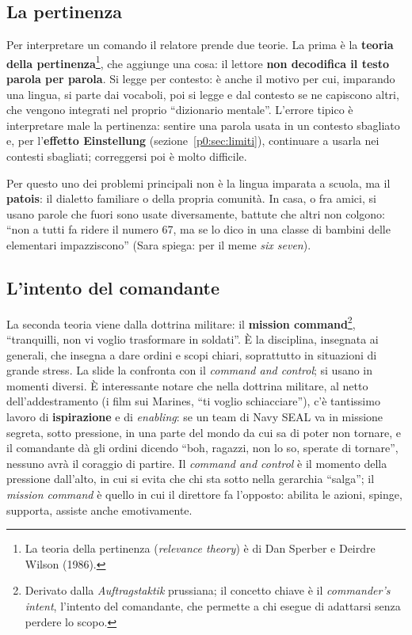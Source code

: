 \subsection{La pertinenza}

Per interpretare un comando il relatore prende due teorie. La prima è la
\textbf{teoria della pertinenza}\footnote{La teoria della pertinenza
(\emph{relevance theory}) è di Dan Sperber e Deirdre Wilson (1986).}, che
aggiunge una cosa: il lettore \textbf{non decodifica il testo parola per
parola}. Si legge per contesto: è anche il motivo per cui, imparando una
lingua, si parte dai vocaboli, poi si legge e dal contesto se ne capiscono
altri, che vengono integrati nel proprio ``dizionario mentale''. L'errore tipico
è interpretare male la pertinenza: sentire una parola usata in un contesto
sbagliato e, per l'\textbf{effetto Einstellung} (sezione~\ref{p0:sec:limiti}),
continuare a usarla nei contesti sbagliati; correggersi poi è molto difficile.

Per questo uno dei problemi principali non è la lingua imparata a scuola, ma il
\textbf{patois}: il dialetto familiare o della propria comunità. In casa, o fra
amici, si usano parole che fuori sono usate diversamente, battute che altri non
colgono: ``non a tutti fa ridere il numero 67, ma se lo dico in una classe di
bambini delle elementari impazziscono'' (Sara spiega: per il meme \emph{six
seven}).

\subsection{L'intento del comandante}

La seconda teoria viene dalla dottrina militare: il \textbf{mission
command}\footnote{Derivato dalla \emph{Auftragstaktik} prussiana; il concetto
chiave è il \emph{commander's intent}, l'intento del comandante, che permette a
chi esegue di adattarsi senza perdere lo scopo.}, ``tranquilli, non vi voglio
trasformare in soldati''. È la disciplina, insegnata ai generali, che insegna a
dare ordini e scopi chiari, soprattutto in situazioni di grande stress. La
slide la confronta con il \emph{command and control}; si usano in momenti
diversi. È interessante notare che nella dottrina militare, al netto
dell'addestramento (i film sui Marines, ``ti voglio schiacciare''), c'è
tantissimo lavoro di \textbf{ispirazione} e di \emph{enabling}: se un team di
Navy SEAL va in missione segreta, sotto pressione, in una parte del mondo da cui
sa di poter non tornare, e il comandante dà gli ordini dicendo ``boh, ragazzi,
non lo so, sperate di tornare'', nessuno avrà il coraggio di partire. Il
\emph{command and control} è il momento della pressione dall'alto, in cui si
evita che chi sta sotto nella gerarchia ``salga''; il \emph{mission command} è
quello in cui il direttore fa l'opposto: abilita le azioni, spinge, supporta,
assiste anche emotivamente.

